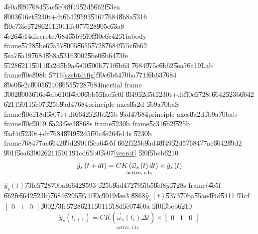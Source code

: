 \documentclass[12pt,a4paper]{article}
\begin{document}
\bigskip

\U{4e0a}\U{8ff0}\U{7684}\U{5fae}\U{5c0f}\U{8f49}\U{52d5}\U{662f}\U{53ea}%
\U{8003}\U{616e}t\U{5230}t+dt\U{6642}\U{9593}\U{5167}\U{7684}\U{8b8a}\U{5316}%
\U{ff0c}\U{73fe}\U{5728}\U{6211}\U{5011}\U{5c07}\U{7528}\U{905e}\U{63a8}%
\U{4e26}\U{4e14}discrete\U{7684}\U{65b9}\U{5f0f}\U{ff0c}\U{6c42}\U{51fa}body
frame\U{5728}\U{5be6}\U{9a57}\U{8005}\U{8655}\U{5728}\U{7684}\U{975c}\U{6b62}%
\U{5ea7}\U{6a19}\U{7684}\U{8b8a}\U{5316}\U{3002}\U{56e0}\U{6b64}\U{73fe}%
\U{5728}\U{6211}\U{5011}\U{8a2d}\U{5b9a}\U{4e00}\U{500b}\U{771f}\U{6b63}%
\U{7684}\U{975c}\U{6b62}\U{5ea7}\U{6a19}Lab frame\thinspace \U{ff0c}\U{898b}%
\U{5716}\ref{szsbtdtfig}\U{ff0c}\U{6b64}\U{70ba}\U{771f}\U{6b63}\U{7684}%
\U{89c0}\U{6e2c}\U{8005}\U{6240}\U{8655}\U{5728}\U{7684}inertial frame%
\U{3002}\U{8003}\U{616e}\U{4efb}\U{610f}\U{4e00}\U{6bb5}\U{5fae}\U{5c0f}%
\U{8f49}\U{52d5}t\U{5230}t+dt\U{ff0c}\U{5728}t\U{6642}\U{523b}\U{6642}%
\U{6211}\U{5011}\U{5c07}\U{525b}\U{9ad4}\U{7684}principle axes\U{8a2d}%
\U{5b9a}\U{70ba}S frame\U{ff0c}\U{518d}\U{5c07}t+dt\U{6642}\U{523b}\U{525b}%
\U{9ad4}\U{7684}principle axes\U{8a2d}\U{5b9a}\U{70ba}b frame\U{ff0c}\U{9019}%
\U{6a23}\U{4ee3}\U{8868}s frame\U{5230}b frame\U{5c31}\U{662f}\U{525b}%
\U{9ad4}t\U{5230}t+dt\U{7684}\U{8f49}\U{52d5}\U{ff0c}\U{4e26}\U{4e14}s%
\U{5230}b frame\U{7684}\U{77ac}\U{6642}\U{89d2}\U{901f}\U{5ea6}\U{4e5f}%
\U{662f}\U{525b}\U{9ad4}\U{8f49}\U{52d5}\U{7684}\U{77ac}\U{6642}\U{89d2}%
\U{901f}\U{5ea6}\U{3002}\U{6211}\U{5011}\U{91cd}\U{65b0}\U{5c07}\ref{vecrot}%
\U{5f0f}\U{5beb}\U{6210}%
\begin{equation}
\hat{y}_{s}\left( t+dt\right) =\underset{\text{active, r.h.}}{CK\left( \vec{%
\omega}_{s}\left( t\right) dt\right) }\times \hat{y}_{s}\left( t\right)
\label{vecrot05}
\end{equation}%
$\hat{y}_{s}\left( t\right) $\U{73fe}\U{5728}\U{70ba}t\U{6642}\U{9593}%
\U{525b}\U{9ad4}\U{7279}\U{5fb5}\U{8ef8}$\hat{y}$\U{5728}s frame(\U{4e5f}%
\U{662f}t\U{6642}\U{523b})\U{7684}\U{6295}\U{5f71}\U{ff0c}\U{9019}\U{4ee3}%
\U{8868}$\hat{y}_{s}\left( t\right) $\U{5373}\U{70ba}\U{55ae}\U{4f4d}\U{5411}%
\U{91cf}$\left[ 
\begin{array}{ccc}
0 & 1 & 0%
\end{array}%
\right] $\U{3002}\U{73fe}\U{5728}\U{6211}\U{5011}\U{518d}\U{5c07}\U{4e0a}%
\U{5f0f}\U{5beb}\U{6210}%
\begin{equation}
\hat{y}_{s}\left( t_{i+1}\right) =\underset{\text{active, r.h.}}{CK\left( 
\vec{\omega}_{s}\left( t_{i}\right) \Delta t\right) }\times \left[ 
\begin{array}{ccc}
0 & 1 & 0%
\end{array}%
\right]  \label{vecrot1}
\end{equation}
\end{document}
